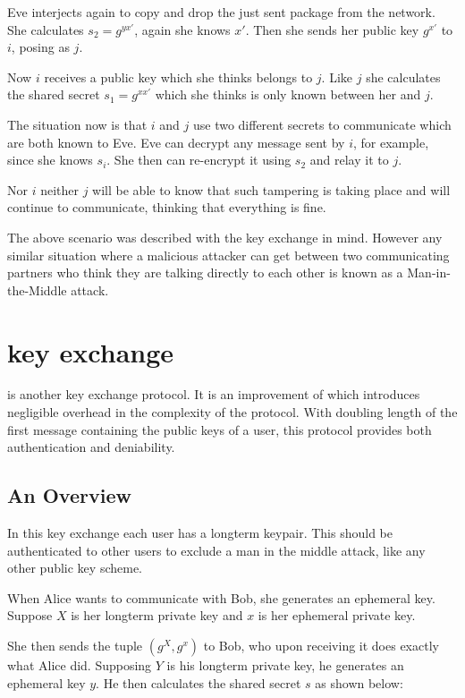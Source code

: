 Eve interjects again to copy and drop the just sent package from the network.
She calculates $s_2 = g^{yx\prime}$, again she knows $x\prime$.
Then she sends her public key $g^{x\prime}$ to $i$, posing as $j$.

Now $i$ receives a public key which she thinks belongs to $j$.
Like $j$ she calculates the shared secret $s_1 = g^{xx\prime}$ which she thinks is only known between her and $j$.

The situation now is that $i$ and $j$ use two different secrets to communicate which are both known to Eve.
Eve can decrypt any message sent by $i$, for example, since she knows $s_i$.
She then can re-encrypt it using $s_2$ and relay it to $j$.

Nor $i$ neither $j$ will be able to know that such tampering is taking place and will continue to communicate, thinking that everything is fine.

The above scenario was described with the \dhname key exchange in mind.
However any similar situation where a malicious attacker can get between two communicating partners who think they are talking directly to each other is known as a Man-in-the-Middle attack.

\section{\tdhname key exchange}

\tdhname is another key exchange protocol.
It is an improvement of \dhname which introduces negligible overhead in the complexity of the protocol.
With doubling length of the first message containing the public keys of a user, this protocol provides both authentication and deniability.

\subsection{An Overview}

In this key exchange each user has a \dhname longterm keypair.
This should be authenticated to other users to exclude a man in the middle attack, like any other public key scheme.

When Alice wants to communicate with Bob, she generates an ephemeral \dhname key.
Suppose $X$ is her longterm private key and $x$ is her ephemeral private key.

She then sends the tuple $(g^X, g^x)$ to Bob, who upon receiving it does exactly what Alice did.
Supposing $Y$ is his longterm private key, he generates an ephemeral key $y$.
He then calculates the shared secret $s$ as shown below:

